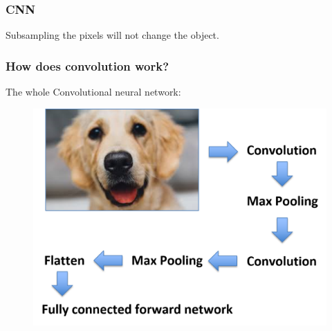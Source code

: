 \documentclass{beamer}
\begin{document}
\begin{frame}
	\frametitle{CNN}
	Subsampling the pixels will not change the object.
	
	\begin{figure}
		\hfill
		\hfill
		\hfill
	\end{figure}
	
\end{frame}

\begin{frame}
	\frametitle{How does convolution work?}
	The whole Convolutional neural network:
	\begin{figure}
	\includegraphics[width=0.8\linewidth]{Picture1}
	\end{figure}
\end{frame}
\end{document}
